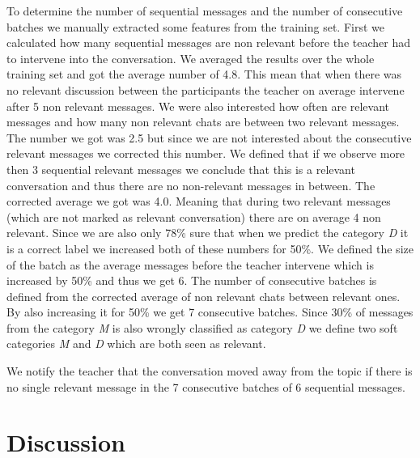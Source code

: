 \documentclass[11pt,a4paper]{article}
\begin{document}
To determine the number of sequential messages and the number of consecutive batches we manually extracted some features from the training set.
First we calculated how many sequential messages are non relevant before the teacher had to intervene into the conversation.
We averaged the results over the whole training set and got the average number of 4.8.
This mean that when there was no relevant discussion between the participants the teacher on average intervene after 5 non relevant messages.
We were also interested how often are relevant messages and how many non relevant chats are between two relevant messages.
The number we got was 2.5 but since we are not interested about the consecutive relevant messages we corrected this number.
We defined that if we observe more then 3 sequential relevant messages we conclude that this is a relevant conversation and thus there are no non-relevant messages in between.
The corrected average we got was 4.0.
Meaning that during two relevant messages (which are not marked as relevant conversation) there are on average 4 non relevant.
Since we are also only 78\% sure that when we predict the category \textit{D} it is a correct label we increased both of these numbers for 50\%.
We defined the size of the batch as the average messages before the teacher intervene which is increased by 50\% and thus we get 6.
The number of consecutive batches is defined from the corrected average of non relevant chats between relevant ones.
By also increasing it for 50\% we get 7 consecutive batches.
Since 30\% of messages from the category \textit{M} is also wrongly classified as category \textit{D} we define two soft categories \textit{M} and \textit{D} which are both seen as relevant.

We notify the teacher that the conversation moved away from the topic if there is no single relevant message in the 7 consecutive batches of 6 sequential messages.

\section{Discussion} 
\end{document}
